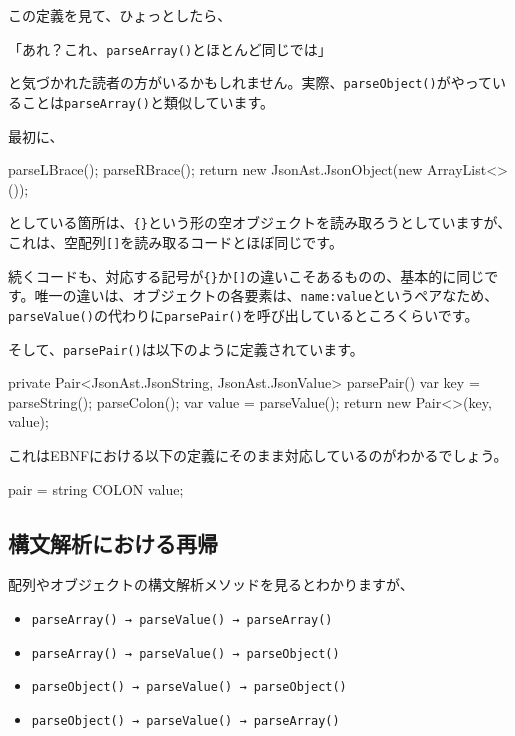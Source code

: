 この定義を見て、ひょっとしたら、

「あれ？これ、\texttt{parseArray()}とほとんど同じでは」

\noindent と気づかれた読者の方がいるかもしれません。実際、\texttt{parseObject()}がやっていることは\texttt{parseArray()}と類似しています。

最初に、

\begin{codescreen}{}
parseLBrace();
parseRBrace();
return new JsonAst.JsonObject(new ArrayList<>());
\end{codescreen}

\noindent としている箇所は、\texttt{\{\}}という形の空オブジェクトを読み取ろうとしていますが、これは、空配列\texttt{{[}{]}}を読み取るコードとほぼ同じです。

続くコードも、対応する記号が\texttt{\{\}}か\texttt{{[}{]}}の違いこそあるものの、基本的に同じです。唯一の違いは、オブジェクトの各要素は、\texttt{name:value}というペアなため、\texttt{parseValue()}の代わりに\texttt{parsePair()}を呼び出しているところくらいです。

そして、\texttt{parsePair()}は以下のように定義されています。

\begin{codescreen}{}
    private Pair<JsonAst.JsonString, JsonAst.JsonValue> parsePair() {
        var key = parseString();
        parseColon();
        var value = parseValue();
        return new Pair<>(key, value);
    }
\end{codescreen}

これはEBNFにおける以下の定義にそのまま対応しているのがわかるでしょう。

\begin{codescreen}{}
pair = string COLON value;
\end{codescreen}

\subsection{構文解析における再帰}

配列やオブジェクトの構文解析メソッドを見るとわかりますが、

\begin{itemize}
\item
  \texttt{parseArray()\ →\ parseValue()\ →\ parseArray()}
\item
  \texttt{parseArray()\ →\ parseValue()\ →\ parseObject()}
\item
  \texttt{parseObject()\ →\ parseValue()\ →\ parseObject()}
\item
  \texttt{parseObject()\ →\ parseValue()\ →\ parseArray()}
\end{itemize}

